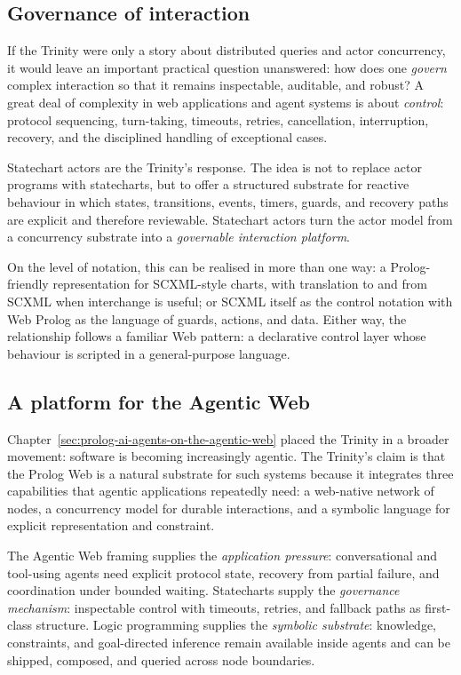 \subsection{Governance of interaction}\label{sec:paradigm-governance}

If the Trinity were only a story about distributed queries and actor
concurrency, it would leave an important practical question unanswered:
how does one \emph{govern} complex interaction so that it remains
inspectable, auditable, and robust? A great deal of complexity in web
applications and agent systems is about \emph{control}: protocol
sequencing, turn-taking, timeouts, retries, cancellation, interruption,
recovery, and the disciplined handling of exceptional cases.

Statechart actors are the Trinity's response. The idea is not to replace
actor programs with statecharts, but to offer a structured substrate for
reactive behaviour in which states, transitions, events, timers, guards,
and recovery paths are explicit and therefore reviewable. Statechart
actors turn the actor model from a concurrency substrate into a
\emph{governable interaction platform}.

On the level of notation, this can be realised in more than one way: a
Prolog-friendly representation for SCXML-style charts, with translation
to and from SCXML when interchange is useful; or SCXML itself as the
control notation with Web Prolog as the language of guards, actions, and
data. Either way, the relationship follows a familiar Web pattern: a
declarative control layer whose behaviour is scripted in a
general-purpose language.


\subsection{A platform for the Agentic Web}\label{sec:paradigm-agentic-web}

Chapter~\ref{sec:prolog-ai-agents-on-the-agentic-web} placed the
Trinity in a broader movement: software is becoming increasingly
agentic. The Trinity's claim is that the Prolog Web is a natural
substrate for such systems because it integrates three capabilities that
agentic applications repeatedly need: a web-native network of nodes, a
concurrency model for durable interactions, and a symbolic language for
explicit representation and constraint.

The Agentic Web framing supplies the \emph{application pressure}:
conversational and tool-using agents need explicit protocol state,
recovery from partial failure, and coordination under bounded waiting.
Statecharts supply the \emph{governance mechanism}: inspectable control
with timeouts, retries, and fallback paths as first-class structure.
Logic programming supplies the \emph{symbolic substrate}: knowledge,
constraints, and goal-directed inference remain available inside agents
and can be shipped, composed, and queried across node boundaries.

